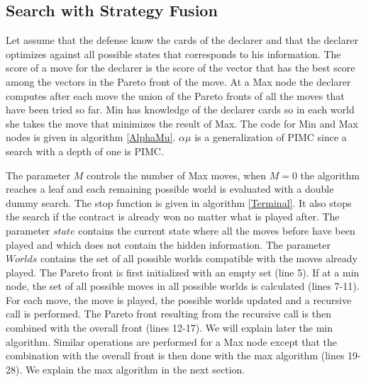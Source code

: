 \documentclass{ecai}
\begin{document}
\subsection{Search with Strategy Fusion}


Let assume that the defense know the cards of the declarer and that
the declarer optimizes against all possible states that corresponds to
his information. The score of a move for the declarer is the score of
the vector that has the best score among the vectors in the Pareto
front of the move. At a Max node the declarer computes after each move
the union of the Pareto fronts of all the moves that have been tried
so far. Min has knowledge of the declarer cards so in each world she
takes the move that minimizes the result of Max. The code for Min and
Max nodes is given in algorithm \ref{AlphaMu}. $\alpha\mu$ is a
generalization of PIMC since a search with a depth of one is PIMC.

The parameter $M$ controls the number of Max moves, when $M = 0$ the
algorithm reaches a leaf and each remaining possible world is
evaluated with a double dummy search. The stop function is given in
algorithm \ref{Terminal}. It also stops the search if the contract is
already won no matter what is played after. The parameter $state$
contains the current state where all the moves before have been played
and which does not contain the hidden information. The parameter
$Worlds$ contains the set of all possible worlds compatible with the
moves already played. The Pareto front is first initialized with an
empty set (line 5). If at a min node, the set of all possible moves in
all possible worlds is calculated (lines 7-11). For each move, the
move is played, the possible worlds updated and a recursive call is
performed. The Pareto front resulting from the recursive call is then
combined with the overall front (lines 12-17). We will explain later
the min algorithm. Similar operations are performed for a Max node
except that the combination with the overall front is then done with
the max algorithm (lines 19-28). We explain the max algorithm in the
next section.
\end{document}
